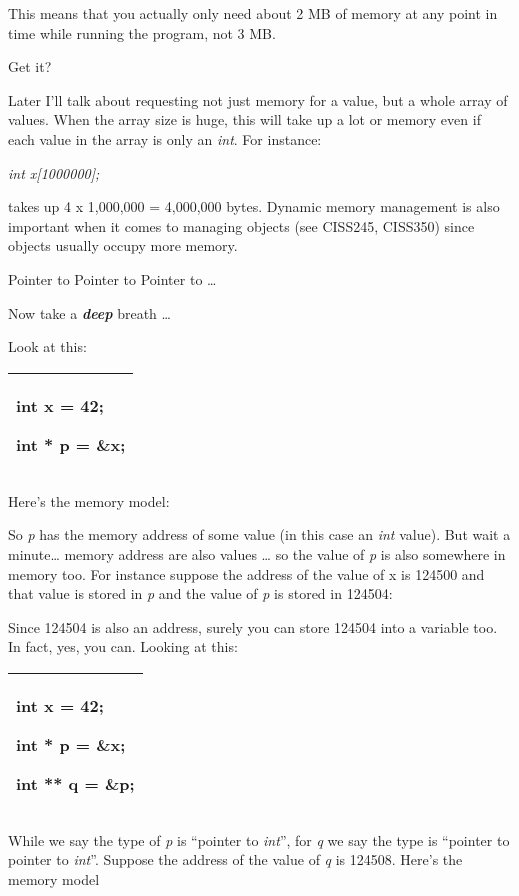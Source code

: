 \documentclass[
]{article}
\begin{document}
This means that you actually only need about 2 MB of memory at any point
in time while running the program, not 3 MB.

Get it?

Later I'll talk about requesting not just memory for a value, but a
whole array of values. When the array size is huge, this will take up a
lot or memory even if each value in the array is only an \emph{int}. For
instance:

\emph{int x{[}1000000{]};}

takes up 4 x 1,000,000 = 4,000,000 bytes. Dynamic memory management is
also important when it comes to managing objects (see CISS245, CISS350)
since objects usually occupy more memory.

Pointer to Pointer to Pointer to \ldots{}

Now take a \emph{\textbf{deep}} breath \ldots{}

Look at this:

\begin{longtable}[]{@{}l@{}}
\toprule
\endhead
\begin{minipage}[t]{0.97\columnwidth}\raggedright
int x = 42;

int * p = \&x;\strut
\end{minipage}\tabularnewline
\bottomrule
\end{longtable}

Here's the memory model:

So \emph{p} has the memory address of some value (in this case an
\emph{int} value). But wait a minute\ldots{} memory address are also
values \ldots{} so the value of \emph{p} is also somewhere in memory
too. For instance suppose the address of the value of x is 124500 and
that value is stored in \emph{p} and the value of \emph{p} is stored in
124504:

Since 124504 is also an address, surely you can store 124504 into a
variable too. In fact, yes, you can. Looking at this:

\begin{longtable}[]{@{}l@{}}
\toprule
\endhead
\begin{minipage}[t]{0.97\columnwidth}\raggedright
int x = 42;

int * p = \&x;

int ** q = \&p;\strut
\end{minipage}\tabularnewline
\bottomrule
\end{longtable}

While we say the type of \emph{p} is ``pointer to \emph{int}'', for
\emph{q} we say the type is ``pointer to pointer to \emph{int}''.
Suppose the address of the value of \emph{q} is 124508. Here's the
memory model
\end{document}
